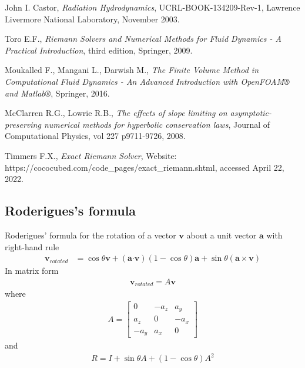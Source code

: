 \documentclass[10pt,letterpaper,notitlepage]{article}
\numberwithin{equation}{section}
\newcommand{\dotp}{\boldsymbol{\cdot}}
\newcommand{\beqn}{\begin{equation}\begin{aligned}}
\newcommand{\eeqn}{\end{aligned}\end{equation}}
\begin{document}
\newpage
\begin{thebibliography}{1}
	

	 John I. Castor, {\em Radiation Hydrodynamics}, UCRL-BOOK-134209-Rev-1, Lawrence Livermore National Laboratory, November 2003.
	
	 Toro E.F., {\em Riemann Solvers and Numerical Methods for Fluid Dynamics - A Practical Introduction}, third edition, Springer, 2009.
	
	 Moukalled F.,  Mangani L., Darwish M., {\em The Finite Volume Method in Computational Fluid Dynamics - An Advanced Introduction with OpenFOAM® and Matlab®}, Springer, 2016.
	
	 McClarren R.G., Lowrie R.B., {\em The effects of slope limiting on asymptotic-preserving numerical methods for hyperbolic conservation laws}, Journal of Computational Physics, vol 227 p9711-9726, 2008.
	
	 Timmers F.X., {\em Exact Riemann Solver}, Website: https://cococubed.com/code\_pages/exact\_riemann.shtml, accessed April 22, 2022.
	
	   
\end{thebibliography}

\newpage
\begin{appendices}
\section{Roderigues's formula} \label{appendix:Roderigues_formula}
Roderigues' formula for the rotation of a vector $\mathbf{v}$ about a unit vector $\mathbf{a}$ with right-hand rule
\begin{equation}
\newcommand{\vvec}{\mathbf{v}}
\newcommand{\avec}{\mathbf{a}}
\begin{aligned}
\vvec_{rotated} &= \cos \theta \vvec + (\avec \dotp \vvec)(1-\cos \theta) \avec + \sin \theta (\avec \times \vvec)
\end{aligned}
\end{equation}
In matrix form
\beqn 
\mathbf{v}_{rotated} = A \mathbf{v}
\eeqn 
where
\beqn 
A = 
\begin{bmatrix}
0 & -a_z & a_y \\
a_z & 0 & -a_x \\
-a_y & a_x & 0
\end{bmatrix}
\eeqn 
and
\beqn 
R = I + \sin\theta A + (1-\cos\theta) A^2
\eeqn

\end{appendices}
\end{document}

